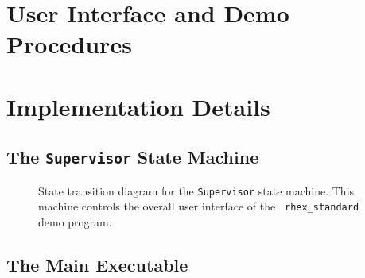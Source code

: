 \section{User Interface and Demo Procedures}

\section{Implementation Details}

\subsection{The {\tt Supervisor} State Machine}

\begin{figure}[ht]
  \begin{center}
    \caption{State transition diagram for the {\tt Supervisor} state
      machine. This machine controls the overall user interface of the {\tt
        rhex\_standard} demo program.}
    \label{fig:supervisor_machine}
  \end{center}
\end{figure}


\subsection{The Main Executable}

